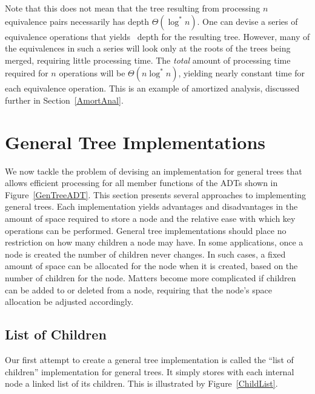 Note that this does not mean that the tree resulting from
processing \(n\) equivalence pairs necessarily has depth
\(\Theta(\log^* n)\).
One can devise a series of equivalence operations that yields
\Thetalogn\ depth for the resulting tree.
However, many of the equivalences in such a series will look only at
the roots of the trees being merged, requiring little processing time.
The \emph{total} amount of processing time required for \(n\)
operations will be \(\Theta(n \log^* n)\),
yielding nearly constant time for each equivalence operation.
This is an example of amortized analysis, discussed
further in Section~\ref{AmortAnal}.

\section{General Tree Implementations}
\label{TreeRepSec}

We now tackle the problem of devising an implementation for general
trees that allows efficient processing for all member functions of the
ADTs shown in Figure~\ref{GenTreeADT}.
This section presents several approaches to implementing general
trees.
Each implementation yields  advantages and disadvantages in the amount
of space required to store a node and the relative ease with which
key operations can be performed.
General tree implementations should place no restriction on how many
children a node may have.
In some applications, once a node is created the number of children
never changes.
In such cases, a fixed amount of space can be allocated for the
node when it is created, based on the number of children for the node.
Matters become more complicated if children can be added to or deleted
from a node, requiring that the node's space allocation be adjusted
accordingly.

\subsection{List of Children}
\label{LOChild}

Our first attempt to create a general tree implementation is called
the ``list of children'' implementation for general trees.
It simply stores with each internal node a
linked list of its children.
This is illustrated by Figure~\ref{ChildList}.

